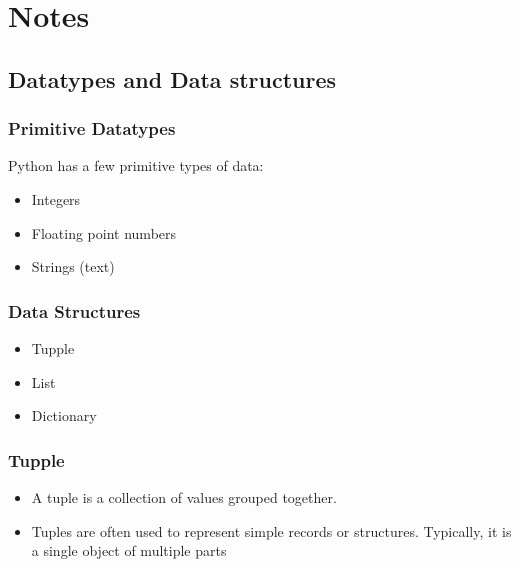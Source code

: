 \documentclass[
  letterpaper,
  DIV=11,
  numbers=noendperiod]{scrreprt}
\providecommand{\tightlist}{%
  \setlength{\itemsep}{0pt}\setlength{\parskip}{0pt}}
\begin{document}
\hypertarget{notes-1}{%
\chapter{Notes}\label{notes-1}}

\hypertarget{datatypes-and-data-structures}{%
\section{Datatypes and Data
structures}\label{datatypes-and-data-structures}}

\hypertarget{primitive-datatypes}{%
\subsection{Primitive Datatypes}\label{primitive-datatypes}}

Python has a few primitive types of data:

\begin{itemize}
\tightlist
\item
  Integers
\item
  Floating point numbers
\item
  Strings (text)
\end{itemize}

\hypertarget{data-structures}{%
\subsection{Data Structures}\label{data-structures}}

\begin{itemize}
\tightlist
\item
  Tupple
\item
  List
\item
  Dictionary
\end{itemize}

\hypertarget{tupple}{%
\subsection{Tupple}\label{tupple}}

\begin{itemize}
\tightlist
\item
  A tuple is a collection of values grouped together.
\item
  Tuples are often used to represent simple records or structures.
  Typically, it is a single object of multiple parts
\end{itemize}
\end{document}

